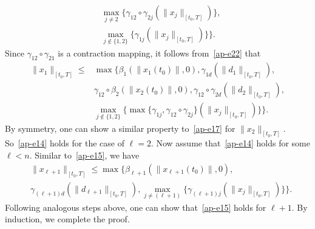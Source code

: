 \documentclass[journal]{IEEEtran}
\newcommand{\nnum}{\nonumber}
\begin{document}
\begin{IEEEproof}
\begin{IEEEproof}
\begin{align}
&\max_{j\neq 2}\{\gamma_{12}\circ\gamma_{2j}(\|x_j\|_{[t_0,T]})\},\nnum\\
&\max_{j\notin\{1,2\}}\{\gamma_{1j}(\|x_j\|_{[t_0,T]})\}\}.\label{ap-e22}\end{align}
Since $\gamma_{12}\circ\gamma_{21}$ is a contraction mapping, it follows from~\eqref{ap-e22} that \begin{align}\|x_1\|_{[t_0,T]}\leq &\max\{\beta_1(\|x_1(t_0)\|,0),\gamma_{1d}(\|d_1\|_{[t_0,T]}),\nnum\\
&\gamma_{12}\circ\beta_2(\|x_2(t_0)\|,0),\gamma_{12}
\circ\gamma_{2d}(\|d_2\|_{[t_0,T]}),\nnum\\
&\max_{j\notin\{1,2\}}\{\max\{\gamma_{1j},
\gamma_{12}\circ\gamma_{2j}\}(\|x_j\|_{[t_0,T]})\}\}.\label{ap-e17}\end{align}
By symmetry, one can show a similar property to~\eqref{ap-e17} for $\|x_2\|_{[t_0,T]}$. So~\eqref{ap-e14} holds for the case of $\ell=2$.
Now assume that~\eqref{ap-e14} holds for some $\ell < n$. Similar to~\eqref{ap-e15}, we have \begin{align}&\|x_{\ell+1}\|_{[t_0,T]}\leq \max\{\beta_{\ell+1}(\|x_{\ell+1}(t_0)\|,0),\nnum\\
&\gamma_{(\ell+1)d}(\|d_{\ell+1}\|_{[t_0,T]}),\max_{j\neq (\ell+1)}\{\gamma_{(\ell+1)j}(\|x_j\|_{[t_0,T]})\}\}.\label{ap-e18}\end{align}
Following analogous steps above, one can show that~\eqref{ap-e15} holds for $\ell+1$. By induction, we complete the proof.
\end{IEEEproof}


\end{IEEEproof}
\end{document}
